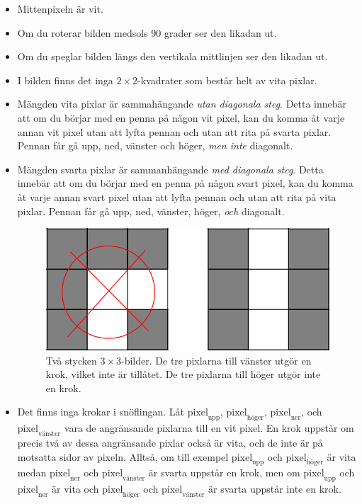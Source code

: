 \begin{itemize}
  \item Mittenpixeln är vit.
  \item Om du roterar bilden medsols 90 grader ser den likadan ut.
  \item Om du speglar bilden längs den vertikala mittlinjen ser den likadan ut.
  \item I bilden finns det inga $2 \times 2$-kvadrater som består helt av vita pixlar. 
  \item Mängden vita pixlar är sammahängande \emph{utan diagonala steg}. 
    Detta innebär att om du börjar med en penna på någon vit pixel, kan 
    du komma åt varje annan vit pixel utan att lyfta pennan och utan
    att rita på svarta pixlar.
    Pennan får gå upp, ned, vänster och höger, \emph{men inte} diagonalt.
  \item Mängden svarta pixlar är sammanhängande \emph{med diagonala steg}.
    Detta innebär att om du börjar med en penna på någon svart pixel, kan 
    du komma åt varje annan svart pixel utan att lyfta pennan och utan
    att rita på vita pixlar.
    Pennan får gå upp, ned, vänster, höger, \emph{och} diagonalt.

\begin{centering}
    \begin{figure}[h]
        \centering
        \includegraphics[scale=0.2]{crook_example.png}
        \caption{Två stycken $3\times 3$-bilder. De tre pixlarna till vänster utgör en krok, vilket inte är tillåtet. De tre pixlarna till höger utgör inte en krok.}
        \label{fig:enter-label}
    \end{figure}
\end{centering}
    
  \item Det finns inga krokar i snöflingan. 
  Låt $\text{pixel}_\text{upp}$, $\text{pixel}_\text{höger}$, $\text{pixel}_\text{ner}$, och $\text{pixel}_\text{vänster}$ vara de angränsande 
  pixlarna till en vit pixel. En krok uppstår om precis två av dessa angränsande pixlar också är vita, och de inte är på motsatta sidor av pixeln.
  Alltså, om till exempel $\text{pixel}_\text{upp}$ och $\text{pixel}_\text{höger}$ är vita medan $\text{pixel}_\text{ner}$ 
  och $\text{pixel}_\text{vänster}$ är svarta uppstår en krok, men om $\text{pixel}_\text{upp}$ och $\text{pixel}_\text{ner}$ är vita
  och $\text{pixel}_\text{höger}$ och $\text{pixel}_\text{vänster}$ är svarta uppstår inte en krok.
      
\end{itemize}

